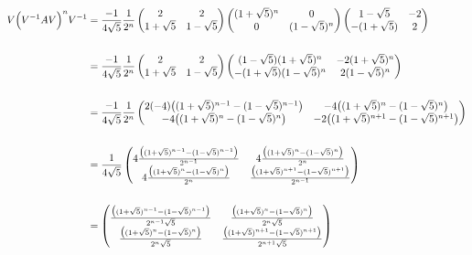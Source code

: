 \begin{align*}
V \Big(V^{-1}AV\Big)^n V^{-1}
&=
\frac{-1}{4\sqrt 5}
\frac{1}{2^n}
\begin{pmatrix}2           & 2          \\1 + \sqrt 5 & 1 - \sqrt 5\\ \end{pmatrix}
\begin{pmatrix}(1 + \sqrt 5)^n & 0              \\0               & (1 - \sqrt 5)^n\\ \end{pmatrix}
\begin{pmatrix}1 - \sqrt 5  & -2\\-(1 + \sqrt 5) & 2\\ \end{pmatrix}
\\\\
&=
\frac{-1}{4\sqrt 5}
\frac{1}{2^n}
\begin{pmatrix}2           & 2          \\1 + \sqrt 5 & 1 - \sqrt 5\\ \end{pmatrix}
\begin{pmatrix}(1 - \sqrt 5)(1 + \sqrt 5)^n & -2(1 + \sqrt 5)^n\\-(1 + \sqrt 5)(1 - \sqrt 5)^n & 2(1 - \sqrt 5)^n\\ \end{pmatrix}
\\\\
&=
\frac{-1}{4\sqrt 5}
\frac{1}{2^n}
\begin{pmatrix}2(-4)\big((1 + \sqrt 5)^{n-1} - (1 - \sqrt 5)^{n-1}\big) & -4\big((1 + \sqrt 5)^n     - (1 - \sqrt 5)^n    \big)\\   -4\big((1 + \sqrt 5)^n     - (1 - \sqrt 5)^n    \big) & -2\big((1 + \sqrt 5)^{n+1} - (1 - \sqrt 5)^{n+1}\big)\\ \end{pmatrix}
\\\\
&=
\frac{1}{4\sqrt 5}
\begin{pmatrix}4\frac{\big((1 + \sqrt 5)^{n-1} - (1 - \sqrt 5)^{n-1}\big)}{2^{n-1}} & 4\frac{\big((1 + \sqrt 5)^n     - (1 - \sqrt 5)^n    \big)}{2^n    }\\4\frac{\big((1 + \sqrt 5)^n     - (1 - \sqrt 5)^n    \big)}{2^n    } &  \frac{\big((1 + \sqrt 5)^{n+1} - (1 - \sqrt 5)^{n+1}\big)}{2^{n-1}}\\ \end{pmatrix}
\\\\
&=
\begin{pmatrix}\frac{\big((1 + \sqrt 5)^{n-1} - (1 - \sqrt 5)^{n-1}\big)}{2^{n-1}\sqrt 5} & \frac{\big((1 + \sqrt 5)^n     - (1 - \sqrt 5)^n    \big)}{2^n    \sqrt 5}\\\frac{\big((1 + \sqrt 5)^n     - (1 - \sqrt 5)^n    \big)}{2^n    \sqrt 5} & \frac{\big((1 + \sqrt 5)^{n+1} - (1 - \sqrt 5)^{n+1}\big)}{2^{n+1}\sqrt 5}\\ \end{pmatrix}
\end{align*}
